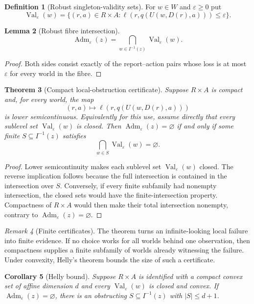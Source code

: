 \documentclass[11pt]{article}
\theoremstyle{plain}
\newtheorem{theorem}{Theorem}[section]
\newtheorem{lemma}[theorem]{Lemma}
\newtheorem{corollary}[theorem]{Corollary}
\theoremstyle{definition}
\newtheorem{definition}[theorem]{Definition}
\theoremstyle{remark}
\newtheorem{remark}[theorem]{Remark}
\newcommand{\Adm}{\operatorname{Adm}}
\newcommand{\eps}{\varepsilon}
\begin{document}
\begin{definition}[Robust singleton-validity sets]\label{def:valeps}
For $w\in W$ and $\eps\ge0$ put
\[
\operatorname{Val}_\eps(w)=
\{(r,a)\in R\times A:
\ell(r,q(U(w,D(r),a)))\le\eps\}.
\]
\end{definition}

\begin{lemma}[Robust fibre intersection]\label{lem:robust-intersection}
\[
\Adm_\eps(z)=
\bigcap_{w\in I^{-1}(z)}\operatorname{Val}_\eps(w).
\]
\end{lemma}

\begin{proof}
Both sides consist exactly of the report--action pairs whose loss is at most
$\eps$ for every world in the fibre.
\end{proof}

\begin{theorem}[Compact local-obstruction certificate]\label{thm:compact-obstruction}
Suppose $R\times A$ is compact and, for every world, the map
\[
(r,a)\longmapsto\ell(r,q(U(w,D(r),a)))
\]
is lower semicontinuous. Equivalently for this use, assume directly that every
sublevel set $\operatorname{Val}_\eps(w)$ is closed. Then
$\Adm_\eps(z)=\varnothing$ if and only if some finite
$S\subseteq I^{-1}(z)$ satisfies
\[
\bigcap_{w\in S}\operatorname{Val}_\eps(w)=\varnothing.
\]
\end{theorem}

\begin{proof}
Lower semicontinuity makes each sublevel set
$\operatorname{Val}_\eps(w)$ closed. The reverse implication follows because
the full intersection is contained in the intersection over $S$. Conversely, if
every finite subfamily had nonempty
intersection, the closed sets would have the finite-intersection property.
Compactness of $R\times A$ would then make their total intersection nonempty,
contrary to $\Adm_\eps(z)=\varnothing$.
\end{proof}

\begin{remark}[Finite certificates]
The theorem turns an infinite-looking local failure into finite evidence. If no
choice works for all worlds behind one observation, then compactness supplies a
finite subfamily of worlds already witnessing the failure. Under convexity,
Helly's theorem bounds the size of such a certificate.
\end{remark}

\begin{corollary}[Helly bound]\label{cor:helly}
Suppose $R\times A$ is identified with a compact convex set of affine dimension
$d$ and every $\operatorname{Val}_\eps(w)$ is closed and convex. If
$\Adm_\eps(z)=\varnothing$, there is an obstructing
$S\subseteq I^{-1}(z)$ with $|S|\le d+1$.
\end{corollary}
\end{document}

